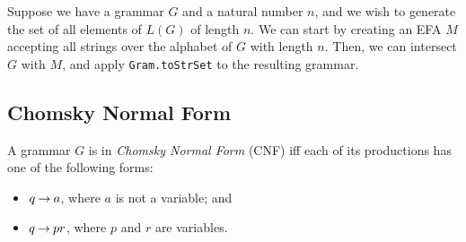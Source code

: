 Suppose we have a grammar $G$ and a natural number $n$, and we wish to
generate the set of all elements of $L(G)$ of length $n$.  We can start by
creating an EFA $M$ accepting all strings over the alphabet of $G$
with length $n$.  Then, we can intersect $G$ with $M$, and apply
\texttt{Gram.toStrSet} to the resulting grammar.

\subsection{Chomsky Normal Form}

A grammar $G$ is in \emph{Chomsky Normal Form} (CNF) iff
each of its productions has one of the following forms:
\begin{itemize}
\item $q\mathbin{\to} a$, where $a$ is not a variable; and

\item $q\mathbin{\to} pr$, where $p$ and $r$ are variables.
\end{itemize}

